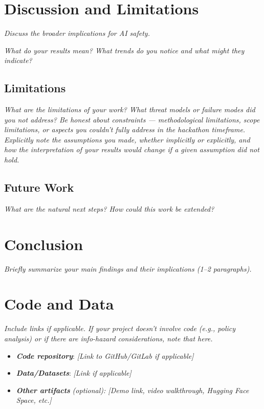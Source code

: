 \documentclass[11pt,letterpaper]{article}
\newcommand{\guide}[1]{\textit{#1}}
\begin{document}
\section{Discussion and Limitations}

\guide{Discuss the broader implications for AI safety.}

\guide{What do your results mean? What trends do you notice and what might they
indicate?}

\subsection*{Limitations}

\guide{What are the limitations of your work? What threat models or failure
modes did you not address? Be honest about constraints --- methodological
limitations, scope limitations, or aspects you couldn't fully address in the
hackathon timeframe. Explicitly note the assumptions you made, whether
implicitly or explicitly, and how the interpretation of your results would
change if a given assumption did not hold.}

\subsection*{Future Work}

\guide{What are the natural next steps? How could this work be extended?}

\section{Conclusion}

\guide{Briefly summarize your main findings and their implications
(1--2 paragraphs).}

\section*{Code and Data}

\guide{Include links if applicable. If your project doesn't involve code
(e.g., policy analysis) or if there are info-hazard considerations, note that
here.}

\begin{itemize}
  \item \textbf{\textit{Code repository}}: \guide{[Link to GitHub/GitLab if applicable]}
  \item \textbf{\textit{Data/Datasets}}: \guide{[Link if applicable]}
  \item \textbf{\textit{Other artifacts}} \guide{(optional): [Demo link, video
        walkthrough, Hugging Face Space, etc.]}
\end{itemize}
\end{document}
